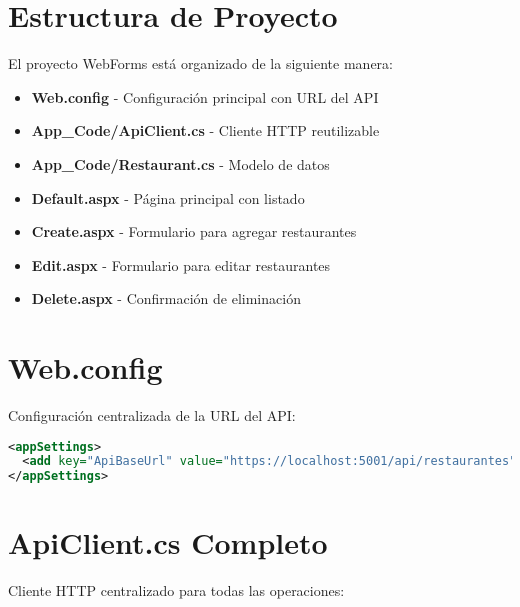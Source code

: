 \documentclass[12pt,a4paper]{report}
\begin{document}
\section{Estructura de Proyecto}

El proyecto WebForms está organizado de la siguiente manera:

\begin{itemize}
    \item \textbf{Web.config} - Configuración principal con URL del API
    \item \textbf{App\_Code/ApiClient.cs} - Cliente HTTP reutilizable
    \item \textbf{App\_Code/Restaurant.cs} - Modelo de datos
    \item \textbf{Default.aspx} - Página principal con listado
    \item \textbf{Create.aspx} - Formulario para agregar restaurantes
    \item \textbf{Edit.aspx} - Formulario para editar restaurantes
    \item \textbf{Delete.aspx} - Confirmación de eliminación
\end{itemize}

\section{Web.config}

Configuración centralizada de la URL del API:

\begin{lstlisting}[language=xml]
<appSettings>
  <add key="ApiBaseUrl" value="https://localhost:5001/api/restaurantes" />
</appSettings>
\end{lstlisting}

\section{ApiClient.cs Completo}

Cliente HTTP centralizado para todas las operaciones:
\end{document}
